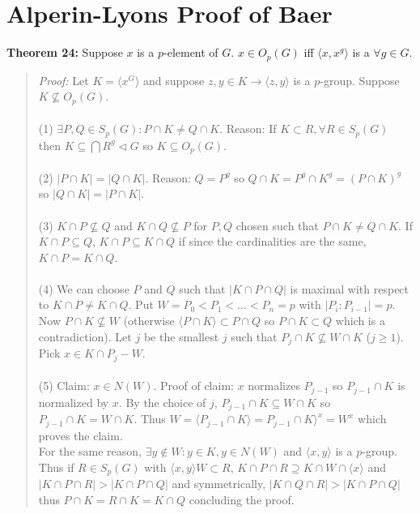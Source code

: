 \section{Alperin-Lyons Proof of Baer}
{\bf Theorem 24:}  Suppose $x$ is a $p$-element of $G$.  
$x \in O_p(G)$ iff $ \langle x, x^g \rangle $ is a $\forall g \in G$.
\begin{quote}
\emph{Proof:}
Let $K= \langle x^G \rangle $ and suppose $z, y \in K \rightarrow \langle z, y \rangle $ 
is a $p$-group.  Suppose $K \nsubseteq O_p(G)$.
\\
\\
(1) $\exists P, Q \in S_p(G): P \cap K \ne Q \cap K$.  
Reason: If $K \subset R, \forall R \in S_p(G)$ then $K \subseteq  \bigcap R^g \lhd G$ so
$K \subseteq O_p(G)$.
\\
\\
(2) $|P \cap K| = |Q \cap K|$.  Reason: $Q= P^g$ so $Q \cap K= P^g \cap K^g= (P \cap K)^g$
so $|Q \cap K|= |P \cap K|$.
\\
\\
(3) $K \cap P \nsubseteq Q$ and $K \cap Q \nsubseteq P$ for $P, Q$ chosen such that
$P \cap K \ne Q \cap K$.  If $K \cap P \subseteq Q$, $K \cap P \subseteq K \cap Q$ if
since the cardinalities are the same, $K \cap P = K \cap Q$.
\\
\\
(4) We can choose $P$ and $Q$ such that $|K \cap P \cap Q|$ is maximal with respect to
$K \cap P \ne K \cap Q$.  Put $W=P_0< P_1< \ldots < P_n=p$ with $|P_i:P_{i-1}|=p$.
Now $P \cap K \nsubseteq W$ (otherwise $ \langle P \cap K \rangle \subset P \cap Q$ so 
$P \cap K \subset Q$
which is a contradiction).
Let $j$ be the smallest $j$ such that $P_j \cap K \nsubseteq W \cap K$ ($ j \ge 1$).  Pick
$x \in K\cap P_j-W$.
\\
\\
(5) Claim: $x \in N(W)$.  Proof of claim: $x$ normalizes $P_{j-1}$ so $P_{j-1} \cap K$
is normalized by $x$.  By the choice of $j$, $P_{j-1} \cap K \subseteq W \cap K$ so
$P_{j-1} \cap K = W \cap K$.  
Thus $W= \langle P_{j-1} \cap K \rangle = P_{j-1} \cap K \rangle^x= W^x$ which
proves the claim.\\
For the same reason, $\exists y \notin W: y \in K, y \in N(W)$ and 
$ \langle x, y \rangle $ is a $p$-group.
Thus if $R \in S_p(G)$ with $ \langle x, y \rangle W  \subset R$,
$K \cap P \cap R \supseteq K \cap W \cap \langle x \rangle $ and 
$|K \cap P \cap R| > |K \cap P \cap Q|$
and symmetrically,
$|K \cap Q \cap R| > |K \cap P \cap Q|$ thus $P \cap K = R \cap K= K \cap Q$ concluding the proof.
\end{quote}
